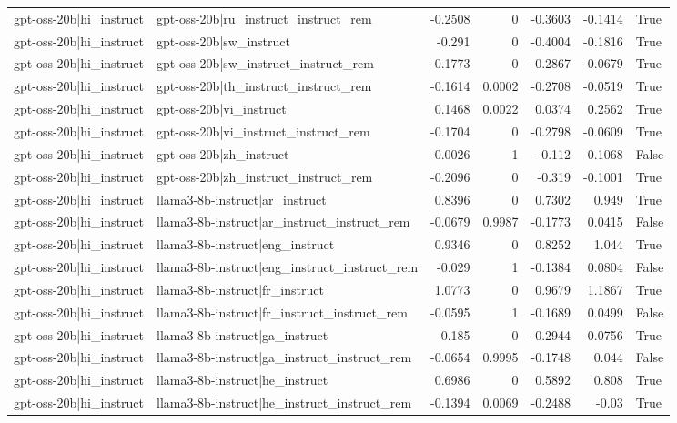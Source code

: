\begin{table}
\begin{tabular}{l l r r r r l}
gpt-oss-20b|hi_instruct & gpt-oss-20b|ru_instruct_instruct_rem & -0.2508 & 0 & -0.3603 & -0.1414 & True \\
gpt-oss-20b|hi_instruct & gpt-oss-20b|sw_instruct & -0.291 & 0 & -0.4004 & -0.1816 & True \\
gpt-oss-20b|hi_instruct & gpt-oss-20b|sw_instruct_instruct_rem & -0.1773 & 0 & -0.2867 & -0.0679 & True \\
gpt-oss-20b|hi_instruct & gpt-oss-20b|th_instruct_instruct_rem & -0.1614 & 0.0002 & -0.2708 & -0.0519 & True \\
gpt-oss-20b|hi_instruct & gpt-oss-20b|vi_instruct & 0.1468 & 0.0022 & 0.0374 & 0.2562 & True \\
gpt-oss-20b|hi_instruct & gpt-oss-20b|vi_instruct_instruct_rem & -0.1704 & 0 & -0.2798 & -0.0609 & True \\
gpt-oss-20b|hi_instruct & gpt-oss-20b|zh_instruct & -0.0026 & 1 & -0.112 & 0.1068 & False \\
gpt-oss-20b|hi_instruct & gpt-oss-20b|zh_instruct_instruct_rem & -0.2096 & 0 & -0.319 & -0.1001 & True \\
gpt-oss-20b|hi_instruct & llama3-8b-instruct|ar_instruct & 0.8396 & 0 & 0.7302 & 0.949 & True \\
gpt-oss-20b|hi_instruct & llama3-8b-instruct|ar_instruct_instruct_rem & -0.0679 & 0.9987 & -0.1773 & 0.0415 & False \\
gpt-oss-20b|hi_instruct & llama3-8b-instruct|eng_instruct & 0.9346 & 0 & 0.8252 & 1.044 & True \\
gpt-oss-20b|hi_instruct & llama3-8b-instruct|eng_instruct_instruct_rem & -0.029 & 1 & -0.1384 & 0.0804 & False \\
gpt-oss-20b|hi_instruct & llama3-8b-instruct|fr_instruct & 1.0773 & 0 & 0.9679 & 1.1867 & True \\
gpt-oss-20b|hi_instruct & llama3-8b-instruct|fr_instruct_instruct_rem & -0.0595 & 1 & -0.1689 & 0.0499 & False \\
gpt-oss-20b|hi_instruct & llama3-8b-instruct|ga_instruct & -0.185 & 0 & -0.2944 & -0.0756 & True \\
gpt-oss-20b|hi_instruct & llama3-8b-instruct|ga_instruct_instruct_rem & -0.0654 & 0.9995 & -0.1748 & 0.044 & False \\
gpt-oss-20b|hi_instruct & llama3-8b-instruct|he_instruct & 0.6986 & 0 & 0.5892 & 0.808 & True \\
gpt-oss-20b|hi_instruct & llama3-8b-instruct|he_instruct_instruct_rem & -0.1394 & 0.0069 & -0.2488 & -0.03 & True \\

\end{tabular}
\end{table}
